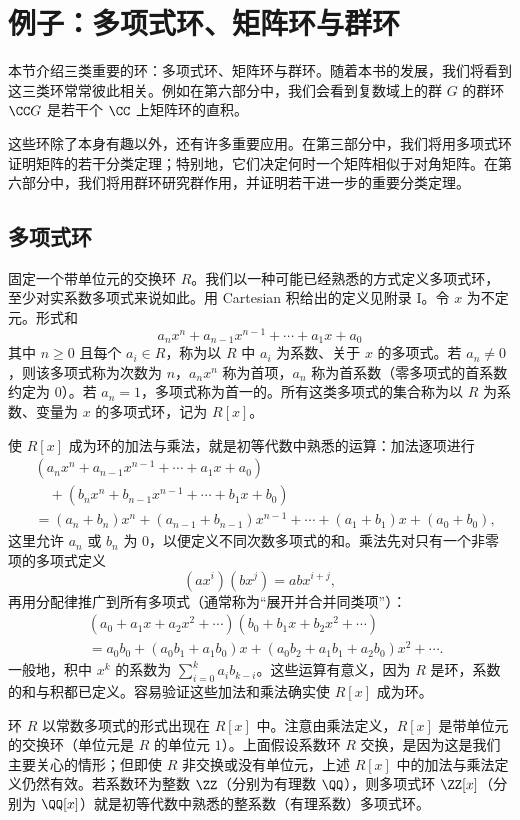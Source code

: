 \section{例子：多项式环、矩阵环与群环}

本节介绍三类重要的环：多项式环、矩阵环与群环。随着本书的发展，我们将看到这三类环常常彼此相关。例如在第六部分中，我们会看到复数域上的群 $G$ 的群环 $\CC G$ 是若干个 $\CC$ 上矩阵环的直积。

这些环除了本身有趣以外，还有许多重要应用。在第三部分中，我们将用多项式环证明矩阵的若干分类定理；特别地，它们决定何时一个矩阵相似于对角矩阵。在第六部分中，我们将用群环研究群作用，并证明若干进一步的重要分类定理。

\subsection*{多项式环}
固定一个带单位元的交换环 $R$。我们以一种可能已经熟悉的方式定义多项式环，至少对实系数多项式来说如此。用 Cartesian 积给出的定义见附录 I。令 $x$ 为不定元。形式和
\[
  a_nx^n+a_{n-1}x^{n-1}+\cdots+a_1x+a_0
\]
其中 $n\geq0$ 且每个 $a_i\in R$，称为以 $R$ 中 $a_i$ 为系数、关于 $x$ 的多项式。若 $a_n\neq0$，则该多项式称为次数为 $n$，$a_nx^n$ 称为首项，$a_n$ 称为首系数（零多项式的首系数约定为 $0$）。若 $a_n=1$，多项式称为首一的。所有这类多项式的集合称为以 $R$ 为系数、变量为 $x$ 的多项式环，记为 $R[x]$。

使 $R[x]$ 成为环的加法与乘法，就是初等代数中熟悉的运算：加法逐项进行
\[
\begin{aligned}
 &(a_nx^n+a_{n-1}x^{n-1}+\cdots+a_1x+a_0)\\
 &\quad +(b_nx^n+b_{n-1}x^{n-1}+\cdots+b_1x+b_0)\\
 &= (a_n+b_n)x^n+(a_{n-1}+b_{n-1})x^{n-1}+\cdots+(a_1+b_1)x+(a_0+b_0),
\end{aligned}
\]
这里允许 $a_n$ 或 $b_n$ 为 $0$，以便定义不同次数多项式的和。乘法先对只有一个非零项的多项式定义
\[
  (ax^i)(bx^j)=abx^{i+j},
\]
再用分配律推广到所有多项式（通常称为“展开并合并同类项”）：
\[
\begin{aligned}
 &(a_0+a_1x+a_2x^2+\cdots)(b_0+b_1x+b_2x^2+\cdots)\\
 &=a_0b_0+(a_0b_1+a_1b_0)x+(a_0b_2+a_1b_1+a_2b_0)x^2+\cdots.
\end{aligned}
\]
一般地，积中 $x^k$ 的系数为 $\sum_{i=0}^k a_i b_{k-i}$。这些运算有意义，因为 $R$ 是环，系数的和与积都已定义。容易验证这些加法和乘法确实使 $R[x]$ 成为环。

环 $R$ 以常数多项式的形式出现在 $R[x]$ 中。注意由乘法定义，$R[x]$ 是带单位元的交换环（单位元是 $R$ 的单位元 $1$）。上面假设系数环 $R$ 交换，是因为这是我们主要关心的情形；但即使 $R$ 非交换或没有单位元，上述 $R[x]$ 中的加法与乘法定义仍然有效。若系数环为整数 $\ZZ$（分别为有理数 $\QQ$），则多项式环 $\ZZ[x]$（分别为 $\QQ[x]$）就是初等代数中熟悉的整系数（有理系数）多项式环。

